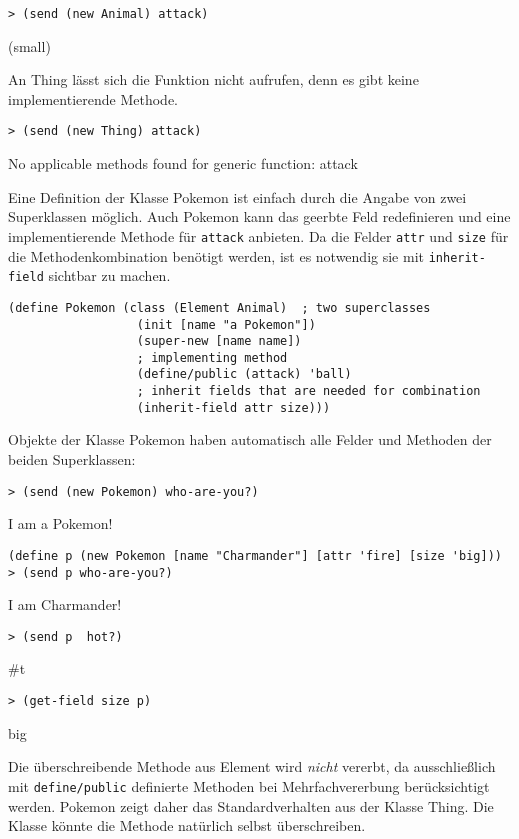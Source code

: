 \begin{lstlisting}
> (send (new Animal) attack)
\end{lstlisting}
{\rsymbol (small)}

An Thing lässt sich die Funktion nicht aufrufen, denn es gibt keine implementierende Methode.

\begin{lstlisting}
> (send (new Thing) attack)
\end{lstlisting}
{\rerror No applicable methods found for generic function: attack}

Eine Definition der Klasse Pokemon ist einfach durch die Angabe von zwei Superklassen möglich. Auch Pokemon kann das geerbte Feld redefinieren und eine implementierende Methode für \texttt{attack} anbieten. Da die Felder \texttt{attr} und \texttt{size} für die Methodenkombination benötigt werden, ist es notwendig sie mit \texttt{inherit-field} sichtbar zu machen.

\begin{lstlisting}
(define Pokemon (class (Element Animal)  ; two superclasses
                  (init [name "a Pokemon"])
                  (super-new [name name])
                  ; implementing method
                  (define/public (attack) 'ball)
                  ; inherit fields that are needed for combination
                  (inherit-field attr size)))
\end{lstlisting}

Objekte der Klasse Pokemon haben automatisch alle Felder und Methoden der beiden Superklassen:

\begin{lstlisting}
> (send (new Pokemon) who-are-you?)
\end{lstlisting}
{\routput {\qq}I am a Pokemon!\qq}

\begin{lstlisting}
(define p (new Pokemon [name "Charmander"] [attr 'fire] [size 'big]))
> (send p who-are-you?)
\end{lstlisting}
{\routput {\qq}I am Charmander!\qq}

\begin{lstlisting}
> (send p  hot?)
\end{lstlisting}
{\routput \#t}

\begin{lstlisting}
> (get-field size p)
\end{lstlisting}
{\rsymbol big}

Die überschreibende Methode aus Element wird \emph{nicht} vererbt, da ausschließlich mit \texttt{define/public} definierte Methoden bei Mehrfachvererbung berücksichtigt werden. Pokemon zeigt daher das Standardverhalten aus der Klasse Thing. Die Klasse könnte die Methode natürlich selbst überschreiben.

